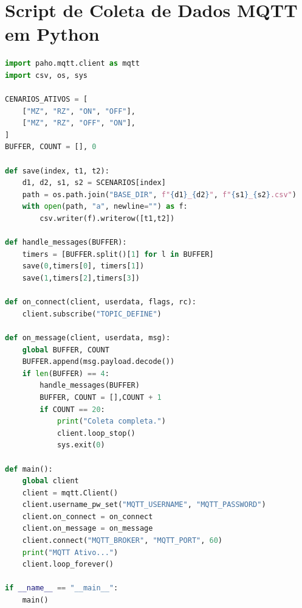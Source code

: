 \appendix
\chapter{Script de Coleta de Dados MQTT em Python}

\begin{lstlisting}[language=Python, basicstyle=\ttfamily\small, breaklines=true]
import paho.mqtt.client as mqtt
import csv, os, sys

CENARIOS_ATIVOS = [
    ["MZ", "RZ", "ON", "OFF"],
    ["MZ", "RZ", "OFF", "ON"],
]
BUFFER, COUNT = [], 0

def save(index, t1, t2):
    d1, d2, s1, s2 = SCENARIOS[index]
    path = os.path.join("BASE_DIR", f"{d1}_{d2}", f"{s1}_{s2}.csv")
    with open(path, "a", newline="") as f:
        csv.writer(f).writerow([t1,t2])

def handle_messages(BUFFER):
    timers = [BUFFER.split()[1] for l in BUFFER]
    save(0,timers[0], timers[1])
    save(1,timers[2],timers[3])

def on_connect(client, userdata, flags, rc):
    client.subscribe("TOPIC_DEFINE")

def on_message(client, userdata, msg):
    global BUFFER, COUNT
    BUFFER.append(msg.payload.decode())
    if len(BUFFER) == 4:
        handle_messages(BUFFER)
        BUFFER, COUNT = [],COUNT + 1
        if COUNT == 20:
            print("Coleta completa.")
            client.loop_stop()
            sys.exit(0)

def main():
    global client
    client = mqtt.Client()
    client.username_pw_set("MQTT_USERNAME", "MQTT_PASSWORD")
    client.on_connect = on_connect
    client.on_message = on_message
    client.connect("MQTT_BROKER", "MQTT_PORT", 60)
    print("MQTT Ativo...")
    client.loop_forever()

if __name__ == "__main__":
    main()
\end{lstlisting}
